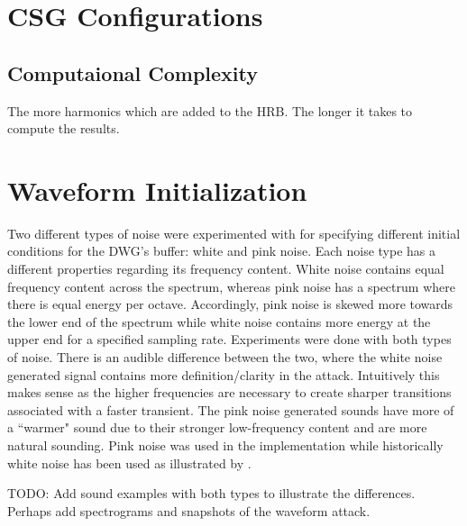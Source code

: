 \documentclass[../main.tex]{subfiles}
\begin{document}
\section{CSG Configurations}
\subsection{Computaional Complexity}
The more harmonics which are added to the HRB. The longer it takes to compute the results.

\section{Waveform Initialization}
Two different types of noise were experimented with for specifying different initial conditions for the DWG's buffer: white and pink noise. Each noise type has a different properties regarding its frequency content. White noise contains equal frequency content across the spectrum, whereas pink noise has a spectrum where there is equal energy per octave. Accordingly, pink noise is skewed more towards the lower end of the spectrum while white noise contains more energy at the upper end for a specified sampling rate. Experiments were done with both types of noise. There is an audible difference between the two, where the white noise generated signal contains more definition/clarity in the attack. Intuitively this makes sense as the higher frequencies are necessary to create sharper transitions associated with a faster transient. The pink noise generated sounds have more of a ``warmer" sound due to their stronger low-frequency content and are more natural sounding. Pink noise was used in the  implementation while historically white noise has been used as illustrated by . 

TODO: Add sound examples with both types to illustrate the differences. Perhaps add spectrograms and snapshots of the waveform attack.
\end{document}
